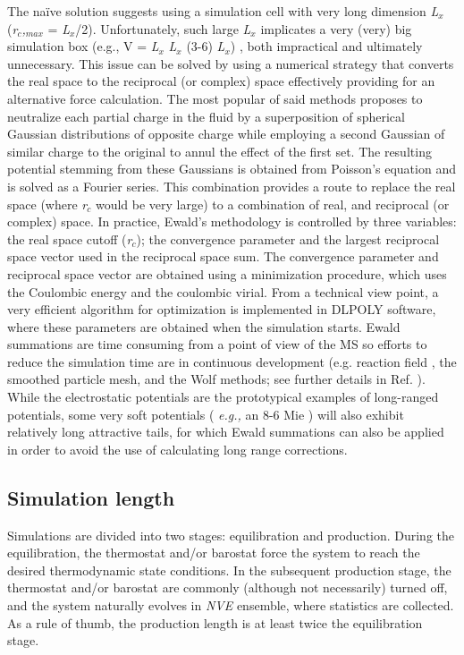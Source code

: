 \documentclass[9pt,bestpractices]{livecoms}
\begin{document}
The na\"{i}ve solution suggests using a simulation cell with very long
dimension \textit{L}$_{x}$ (\textit{r}$_{c}$\textit{,}$_{max}$ = \textit{L}$_{x}$/2).
Unfortunately, such large \textit{L}$_{x}$ implicates a very (very) big
simulation box (e.g., V = \textit{L}$_{x}$ \textit{L}$_{x}$ (3-6)
\textit{L}$_{x}$) , both impractical and ultimately unnecessary. This issue can
be solved by using a numerical strategy that converts the real space to
the reciprocal (or complex) space effectively providing for an alternative force
calculation.  The most popular of said methods \citep{ewald1921}
proposes to neutralize
each partial charge in the fluid by a superposition of spherical Gaussian
distributions of opposite charge while employing a second Gaussian of similar
charge to the original to annul the effect of the first set. The resulting
potential stemming from these Gaussians is obtained from Poisson's equation and
is solved as a Fourier series. This combination provides a route to replace the
real space (where \textit{r}$_{c}$ would be very large) to a combination of
real, and reciprocal (or complex) space. In practice, Ewald's methodology
is controlled by three variables: the real space cutoff (\textit{r}$_{c}$); the
convergence parameter and the largest reciprocal space vector used in the
reciprocal space sum. The convergence parameter and reciprocal space vector are
obtained using a minimization procedure, which uses the Coulombic energy and
the coulombic virial. From a technical view point, a very efficient algorithm
for optimization is implemented in DLPOLY software, where these parameters are
obtained when the simulation starts. Ewald summations are time consuming from
a point of view of the MS so efforts to reduce the simulation time are in
continuous development (e.g. reaction field \citep{barker1973,watts1974},
the smoothed particle mesh\citep{darden1993},
and the Wolf\citep{wolf1999} methods; see further details in Ref. \citep{allen2017}).
While the electrostatic potentials are the
prototypical examples of long-ranged potentials, some very soft potentials
( \textit{e.g.,} an 8-6 Mie ) will also exhibit relatively long attractive
tails, for which Ewald summations can also be applied in order to avoid the use
of calculating long range corrections\citep{kissel}.

\subsection{Simulation length} 
Simulations are divided into two stages: equilibration and production. During
the equilibration, the thermostat and/or barostat force the system to reach the
desired thermodynamic state conditions. In the subsequent production stage, the
thermostat and/or barostat are commonly (although not necessarily) turned off,
and the system naturally evolves in \textit{NVE} ensemble, where statistics are
collected. As a rule of thumb, the production length is at least twice the
equilibration stage. 
\end{document}
